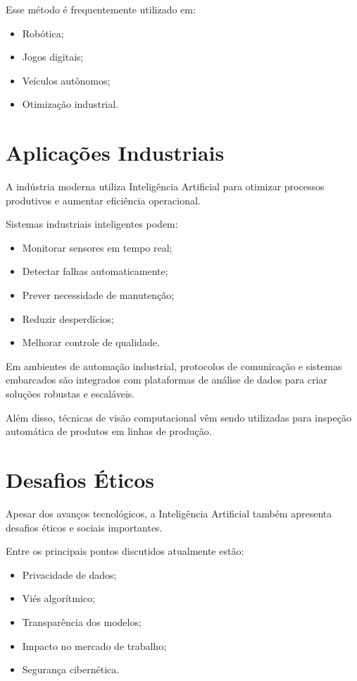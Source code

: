\documentclass[11pt]{article}
\begin{document}
Esse método é frequentemente utilizado em:

\begin{itemize}
    \item Robótica;
    \item Jogos digitais;
    \item Veículos autônomos;
    \item Otimização industrial.
\end{itemize} 

\section{Aplicações Industriais}

A indústria moderna utiliza Inteligência Artificial para otimizar processos produtivos e aumentar
eficiência operacional.

Sistemas industriais inteligentes podem:

\begin{itemize}
    \item Monitorar sensores em tempo real;
    \item Detectar falhas automaticamente;
    \item Prever necessidade de manutenção;
    \item Reduzir desperdícios;
    \item Melhorar controle de qualidade.
\end{itemize}

Em ambientes de automação industrial, protocolos de comunicação e sistemas embarcados são
integrados com plataformas de análise de dados para criar soluções robustas e escaláveis.
 
Além disso, técnicas de visão computacional vêm sendo utilizadas para inspeção automática de
produtos em linhas de produção.

\section{Desafios Éticos}

Apesar dos avanços tecnológicos, a Inteligência Artificial também apresenta desafios éticos e
sociais importantes.

Entre os principais pontos discutidos atualmente estão:

\begin{itemize}
    \item Privacidade de dados;
    \item Viés algorítmico;
    \item Transparência dos modelos;
    \item Impacto no mercado de trabalho;
    \item Segurança cibernética.
\end{itemize}
\end{document}

